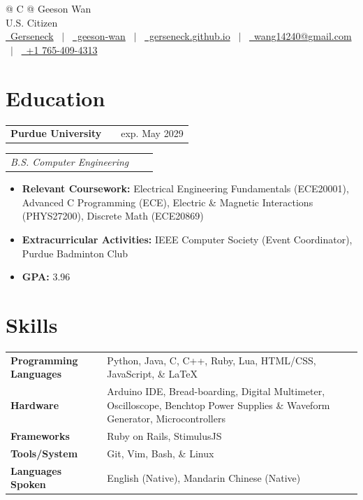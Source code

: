 \documentclass[letter, 10.5pt]{article}
\makeatletter
\newenvironment{job}[2]{%
    \begin{tabularx}{\linewidth}{@{}l X r@{}}%
        \textbf{#1} & \hfill & #2 \\%
    \end{tabularx}%
}{}
\newcommand{\jobdescription}[2]{%
    \begin{tabularx}{\linewidth}{@{}l X r@{}}%
        \footnotesize{\textit{#1}} &%
        \hfill &%
        \ifstrempty{#2}{}{\footnotesize{\textit{#2}}} \\%
    \end{tabularx}%
}
\makeatother
\begin{document}
\pagestyle{empty} 

\begin{tabularx}{\linewidth}{@{} C @{}}
    \Huge{Geeson Wan} \\
    U.S. Citizen \hfill \\[5.5pt]
    \href{https://github.com/Gerseneck}{\raisebox{-0.05\height}\faGithub\ Gerseneck} \ $|$ \ 
    \href{https://linkedin.com/in/geeson-wan}{\raisebox{-0.05\height}\faLinkedin\ geeson-wan} \ $|$ \ 
    \href{https://gerseneck.github.io}{\raisebox{-0.05\height}\faGlobe \ gerseneck.github.io} \ $|$ \ 
    \href{mailto:wang14240@gmail.com}{\raisebox{-0.05\height}\faEnvelope \ wang14240@gmail.com} \ $|$ \
    \href{tel:7654094313}{\raisebox{-0.05\height}\faMobile \ +1 765-409-4313} \\
\end{tabularx}

\section{Education}

\begin{job}{Purdue University}{exp. May 2029}
    \vspace{-0.5em}
    \jobdescription{B.S. Computer Engineering}{West Lafayette, IN}
    \begin{itemize}
        \item \textbf{Relevant Coursework:} Electrical Engineering Fundamentals (ECE20001), Advanced C Programming (ECE), Electric \& Magnetic Interactions (PHYS27200), Discrete Math (ECE20869)
        \item \textbf{Extracurricular Activities:} IEEE Computer Society (Event Coordinator), Purdue Badminton Club
        \item \textbf{GPA:} 3.96
    \end{itemize}
\end{job}

\section{Skills}

\begin{tabularx}{\linewidth}{@{}l X@{}}
    \textbf{Programming Languages} & Python, Java, C, C++, Ruby, Lua, HTML/CSS, JavaScript, \& \LaTeX \\
    \textbf{Hardware} & Arduino IDE, Bread-boarding, Digital Multimeter, Oscilloscope, Benchtop Power Supplies \& Waveform Generator, Microcontrollers \\
    \textbf{Frameworks} & Ruby on Rails, StimulusJS \\
    \textbf{Tools/System} & Git, Vim, Bash, \& Linux \\
    \textbf{Languages Spoken} & English (Native), Mandarin Chinese (Native) \\
\end{tabularx}
\end{document}

